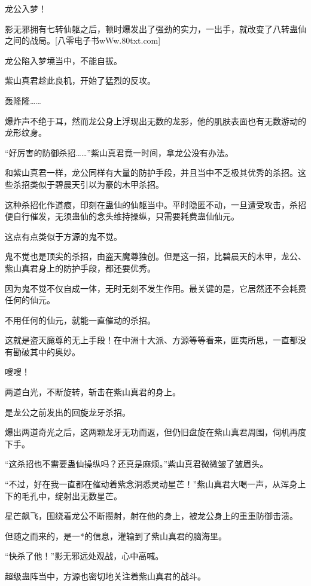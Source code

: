 
\begin{this_body}

龙公入梦！

影无邪拥有七转仙躯之后，顿时爆发出了强劲的实力，一出手，就改变了八转蛊仙之间的战局。[八零电子书wWw.80txt.com]

龙公陷入梦境当中，不能自拔。

紫山真君趁此良机，开始了猛烈的反攻。

轰隆隆……

爆炸声不绝于耳，然而龙公身上浮现出无数的龙影，他的肌肤表面也有无数游动的龙形纹身。

“好厉害的防御杀招……”紫山真君竟一时间，拿龙公没有办法。

和紫山真君一样，龙公同样有大量的防护手段，并且当中不乏极其优秀的杀招。这些杀招类似于碧晨天引以为豪的木甲杀招。

这种杀招化作道痕，印刻在蛊仙的仙躯当中。平时隐匿不动，一旦遭受攻击，杀招便自行催发，无须蛊仙的念头维持操纵，只需要耗费蛊仙仙元。

这点有点类似于方源的鬼不觉。

鬼不觉也是顶尖的杀招，由盗天魔尊独创。但是这一招，比碧晨天的木甲，龙公、紫山真君身上的防护手段，都还要优秀。

因为鬼不觉不仅自成一体，无时无刻不发生作用。最关键的是，它居然还不会耗费任何的仙元。

不用任何的仙元，就能一直催动的杀招。

这就是盗天魔尊的无上手段！在中洲十大派、方源等等看来，匪夷所思，一直都没有勘破其中的奥妙。

嗖嗖！

两道白光，不断旋转，斩击在紫山真君的身上。

是龙公之前发出的回旋龙牙杀招。

爆出两道奇光之后，这两颗龙牙无功而返，但仍旧盘旋在紫山真君周围，伺机再度下手。

“这杀招也不需要蛊仙操纵吗？还真是麻烦。”紫山真君微微皱了皱眉头。

“不过，好在我一直都在催动着紫念洞悉灵动星芒！”紫山真君大喝一声，从浑身上下的毛孔中，绽射出无数星芒。

星芒飙飞，围绕着龙公不断攒射，射在他的身上，被龙公身上的重重防御击溃。

但随之而来的，是一*的信息，灌输到了紫山真君的脑海里。

“快杀了他！”影无邪远处观战，心中高喊。

超级蛊阵当中，方源也密切地关注着紫山真君的战斗。


\end{this_body}
